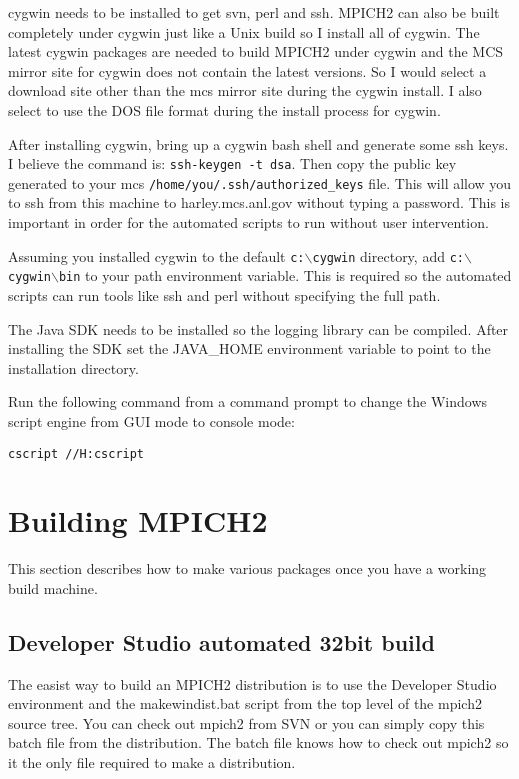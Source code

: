 \documentclass[dvipdfm,11pt]{article}
\begin{document}
cygwin needs to be installed to get svn, perl and ssh.  MPICH2 can also be built completely
under cygwin just like a Unix build so I install all of cygwin.  The latest cygwin packages
are needed to build MPICH2 under cygwin and the MCS mirror site for cygwin does not contain
the latest versions.  So I would select a download site other than the mcs mirror site during
the cygwin install.  I also select to use the DOS file format during the install process for 
cygwin.

After installing cygwin, bring up a cygwin bash shell and generate some ssh keys.  I believe
the command is: \texttt{ssh-keygen -t dsa}.  Then copy the public key generated to your
mcs \texttt{/home/you/.ssh/authorized\_keys} file.  This will allow you to ssh from this machine
to harley.mcs.anl.gov without typing a password.  This is important in order for the 
automated scripts to run without user intervention.

Assuming you installed cygwin to the default \texttt{c:$\backslash$cygwin} directory, add 
\texttt{c:$\backslash$cygwin$\backslash$bin} to your path environment variable.  This is 
required so the automated scripts can run tools like ssh and perl without specifying the 
full path.

The Java SDK needs to be installed so the logging library can be compiled. After installing
the SDK set the JAVA\_HOME environment variable to point to the installation directory. 

Run the following command from a command prompt to change the Windows script engine from
GUI mode to console mode:
\begin{verbatim}
cscript //H:cscript
\end{verbatim}

\section{Building MPICH2}
\label{sec:building}

This section describes how to make various packages once you have a working build machine.

\subsection{Developer Studio automated 32bit build}
\label{sec:devstudiobuild}

The easist way to build an MPICH2 distribution is to use the Developer Studio environment
and the makewindist.bat script from the top level of the mpich2 source tree.  You can check
out mpich2 from SVN or you can simply copy this batch file from the distribution.  The batch
file knows how to check out mpich2 so it the only file required to make a distribution.
\end{document}
